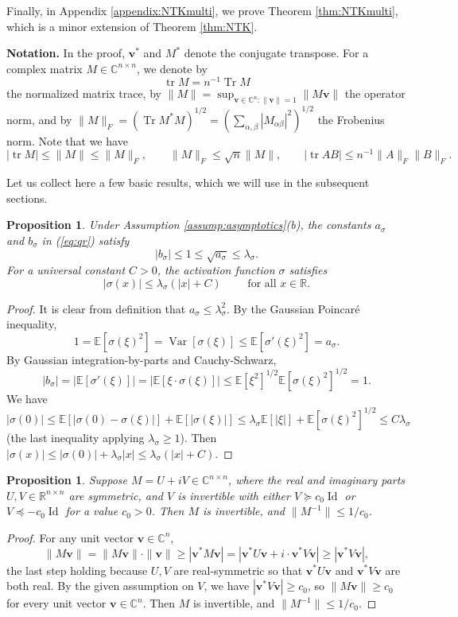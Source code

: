 \documentclass{article}
\newtheorem{proposition}[theorem]{Proposition}
\theoremstyle{definition}
\newcommand{\R}{\mathbb{R}}
\newcommand{\C}{\mathbb{C}}
\newcommand{\E}{\mathbb{E}}
\newcommand{\Id}{\operatorname{Id}}
\newcommand{\Tr}{\operatorname{Tr}}
\newcommand{\tr}{\operatorname{tr}}
\renewcommand{\v}{\mathbf{v}}
\renewcommand{\a}{\alpha}
\renewcommand{\b}{\beta}
\newcommand{\1}{\mathbf{1}}
\newcommand{\Var}{\operatorname{Var}}
\begin{document}
Finally, in Appendix \ref{appendix:NTKmulti}, we prove Theorem
\ref{thm:NTKmulti}, which is a minor extension of Theorem \ref{thm:NTK}.

{\bf Notation.} In the proof, $\v^*$ and $M^*$ denote the conjugate transpose.
For a complex matrix $M \in \C^{n \times n}$,
we denote by
\[\tr M=n^{-1}\Tr M\]
the normalized matrix trace, by
$\|M\|=\sup_{\v \in \C^n:\|\v\|=1} \|M\v\|$ the operator norm, and by
$\|M\|_F=(\Tr M^*M)^{1/2}=(\sum_{\a,\b} |M_{\a\b}|^2)^{1/2}$ the Frobenius 
norm. Note that we have
\[|\tr M| \leq \|M\| \leq \|M\|_F, \qquad \|M\|_F \leq
\sqrt{n}\|M\|, \qquad |\tr AB| \leq n^{-1}\|A\|_F\|B\|_F.\]

Let us collect here a few basic results, which we will use in the subsequent
sections.

\begin{proposition}\label{prop:sigmaproperties}
Under Assumption \ref{assump:asymptotics}(b),
the constants $a_\sigma$ and $b_\sigma$ in (\ref{eq:qr}) satisfy
\[|b_\sigma| \leq 1 \leq \sqrt{a_\sigma} \leq \lambda_\sigma.\]
For a universal constant $C>0$, the activation function $\sigma$ satisfies
\begin{equation}\label{eq:sigmabound}
|\sigma(x)| \leq \lambda_\sigma(|x|+C) \qquad \text{ for all } x \in \R.
\end{equation}
\end{proposition}
\begin{proof}
It is clear from definition that $a_\sigma \leq \lambda_\sigma^2$.
By the Gaussian Poincar\'e inequality,
\[1=\E[\sigma(\xi)^2]=\Var[\sigma(\xi)]
\leq \E[\sigma'(\xi)^2]=a_\sigma.\]
By Gaussian integration-by-parts and Cauchy-Schwarz,
\[|b_\sigma|=|\E[\sigma'(\xi)]|=|\E[\xi \cdot \sigma(\xi)]|
\leq \E[\xi^2]^{1/2}\E[\sigma(\xi)^2]^{1/2}=1.\]
We have
\begin{equation}\label{eq:sigma0bound}
|\sigma(0)| \leq \E[|\sigma(0)-\sigma(\xi)|]+\E[|\sigma(\xi)|]
\leq \lambda_\sigma \E[|\xi|]+\E[\sigma(\xi)^2]^{1/2}
\leq C\lambda_\sigma
\end{equation}
(the last inequality applying $\lambda_\sigma \geq 1$). Then
$|\sigma(x)| \leq |\sigma(0)|+\lambda_\sigma |x| \leq \lambda_\sigma(|x|+C)$.
\end{proof}

\begin{proposition}\label{prop:invertible}
Suppose $M=U+iV \in \C^{n \times n}$, where the real and imaginary parts
$U,V \in \R^{n \times n}$ are symmetric, and $V$ is
invertible with either $V \succeq c_0\Id$ or $V \preceq -c_0\Id$ for a value
$c_0>0$. Then $M$ is invertible, and $\|M^{-1}\| \leq 1/c_0$.
\end{proposition}
\begin{proof}
For any unit vector $\v \in \C^n$,
\[\|M\v\|=\|M\v\| \cdot \|\v\| \geq |\v^* M\v|
=|\v^*U\v+i \cdot \v^*V\v| \geq |\v^*V\v|,\]
the last step holding because $U,V$ are real-symmetric so that
$\v^*U\v$ and $\v^*V\v$ are both real. By the given assumption on $V$, we have
$|\v^*V\v| \geq c_0$, so $\|M\v\| \geq c_0$ for every unit vector $\v \in \C^n$.
Then $M$ is invertible, and $\|M^{-1}\| \leq 1/c_0$.
\end{proof}
\end{document}
